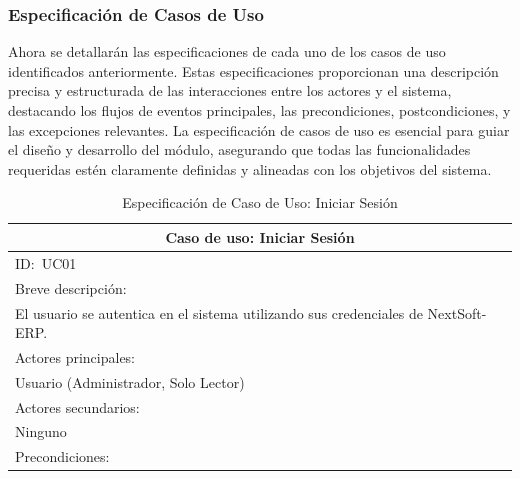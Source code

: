 \documentclass[stu, 12pt, letterpaper, donotrepeattitle, floatsintext, natbib]{apa7}
\begin{document}
\subsubsection{Especificación de Casos de Uso}
Ahora se detallarán las especificaciones de cada uno de los casos de uso identificados anteriormente. Estas especificaciones proporcionan una
descripción precisa y estructurada de las interacciones entre los actores y el sistema, destacando los flujos de eventos principales, las
precondiciones, postcondiciones, y las excepciones relevantes. La especificación de casos de uso es esencial para guiar el diseño y desarrollo
del módulo, asegurando que todas las funcionalidades requeridas estén claramente definidas y alineadas con los objetivos del sistema.
\newline
\begin{longtable}{@{} p{16.5cm} @{}}
    \caption{Especificación de Caso de Uso: Iniciar Sesión}\label{tab:UC01}                                                             \\ \toprule
    \multicolumn{1}{c}{Caso de uso: Iniciar Sesión}                                                                                     \\ \midrule
    ID:~UC01                                                                                                                            \\ \midrule
    Breve descripción:                                                                                                                  \\
    El usuario se autentica en el sistema utilizando sus credenciales de NextSoft-ERP.                                                  \\ \midrule
    Actores principales:                                                                                                                \\
    Usuario (Administrador, Solo Lector)                                                                                                \\ \midrule
    Actores secundarios:                                                                                                                \\
    Ninguno                                                                                                                             \\ \midrule
    Precondiciones:                                                                                                                     \\

\end{longtable}
\end{document}
